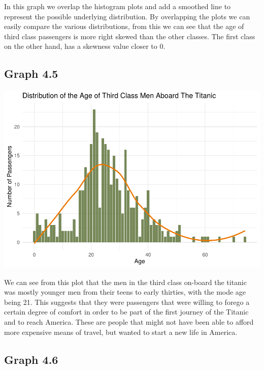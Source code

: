 \documentclass[
  11pt,
]{article}
\begin{document}
In this graph we overlap the histogram plots and add a smoothed line to
represent the possible underlying distribution. By overlapping the plots
we can easily compare the various distributions, from this we can see
that the age of third class passengers is more right skewed than the
other classes. The first class on the other hand, has a skewness value
closer to 0.

\hypertarget{graph-4.5}{%
\subsection{Graph 4.5}\label{graph-4.5}}

\includegraphics{README_files/figure-latex/unnamed-chunk-6-1.pdf}

We can see from this plot that the men in the third class on-board the
titanic was mostly younger men from their teens to early thirties, with
the mode age being 21. This suggests that they were passengers that were
willing to forego a certain degree of comfort in order to be part of the
first journey of the Titanic and to reach America. These are people that
might not have been able to afford more expensive means of travel, but
wanted to start a new life in America.

\hypertarget{graph-4.6}{%
\subsection{Graph 4.6}\label{graph-4.6}}
\end{document}
